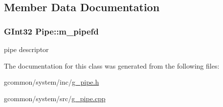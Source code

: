 \subsection{Member Data Documentation}
\hypertarget{class_pipe_a7776259caf82021e2ac6e1de6a14941b}{
\subsubsection[{m\-\_\-pipefd}]{\setlength{\rightskip}{0pt plus 5cm}G\-Int32 Pipe\-::m\-\_\-pipefd\hspace{0.3cm}{\ttfamily [protected]}}}\label{class_pipe_a7776259caf82021e2ac6e1de6a14941b}
pipe descriptor 

The documentation for this class was generated from the following files\-:\begin{DoxyCompactItemize}
\item 
gcommon/system/inc/\hyperlink{g__pipe_8h}{g\-\_\-pipe.\-h}\item 
gcommon/system/src/\hyperlink{g__pipe_8cpp}{g\-\_\-pipe.\-cpp}\end{DoxyCompactItemize}
